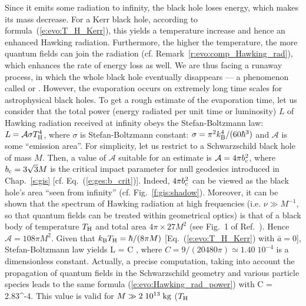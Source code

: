 Since it emits some radiation to infinity, the black hole loses energy, which
makes its mass decrease. For a Kerr black hole, according to formula~(\ref{e:evo:T_H_Kerr}),
this yields a temperature increase and hence an enhanced Hawking radiation. Furthermore,
the higher the temperature,
the more quantum fields can join the radiation
(cf. Remark~\ref{r:evo:comp_Hawking_rad}), which enhances
the rate of energy loss as well. We are thus facing a runaway process, in which the whole
black hole eventually disappears --- a phenomenon called
 or
.
However, the evaporation occurs on extremely long time scales for astrophysical black holes.
To get a rough estimate of the evaporation time, let us consider
that the total power
(energy radiated per unit time or luminosity) $L$ of Hawking radiation received at infinity
obeys the Stefan-Boltzmann law:
$L = \mathcal{A} \sigma T_{\rm H}^4$, where $\sigma$ is Stefan-Boltzmann constant:
$\sigma = \pi^2 k_{\rm B}^4/(60 \hbar^3)$ and $\mathcal{A}$ is some ``emission area''.
For simplicity, let us restrict to a Schwarzschild black hole of mass $M$. Then, a value
of $\mathcal{A}$ suitable for an estimate is
$\mathcal{A} = 4\pi b_{\rm c}^2$, where
$b_{\rm c} = 3\sqrt{3} M$ is the critical impact parameter for null geodesics
introduced in Chap.~\ref{s:gis} [cf. Eq.~(\ref{e:ges:b_crit})]. Indeed, $4 \pi b_{\rm c}^2$
can be viewed as the black hole's area ``seen from infinity'' (cf. Fig.~\ref{f:gis:shadow}).
Moreover, it can be shown that the spectrum of Hawking radiation at high frequencies (i.e. $\nu \gg M^{-1}$, so that quantum fields can be treated within geometrical optics) is that of a black
body of temperature $T_{\rm H}$ and total area $4\pi \times 27 M^2$ (see Fig.~1 of Ref.~\cite{Page76}). Hence
$\mathcal{A} = 108\pi M^2$. Given that
$k_{\rm B} T_{\rm H} = \hbar/(8\pi M)$ [Eq.~(\ref{e:evo:T_H_Kerr}) with $\bar{a}=0$],
Stefan-Boltzmann law yields
\be \label{e:evo:Hawking_rad_power}
    L = C  ,
\ee
where $C = 9 / (20480\pi) \simeq 1.40\; 10^{-4}$ is a dimensionless constant.
Actually, a precise computation, taking
into account the propagation of quantum fields in the Schwarzschild geometry
and various particle species
leads to the same formula (\ref{e:evo:Hawking_rad_power}) with \cite{ThornZP86,Page76,Page05}
\be \label{e:evo:Hawking_rad_power_alpha}
    C = 2.83^{-4}.
\ee
This value is valid for $M \gg 2\; 10^{13} {\rm\; kg}$ ($T_{\rm H}$
